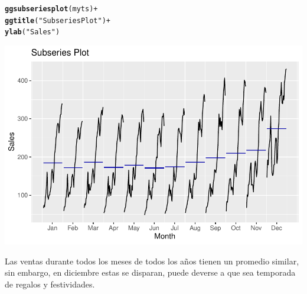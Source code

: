 \documentclass[12pt]{article}\usepackage[]{graphicx}\usepackage[]{xcolor}
\makeatletter
\def\maxwidth{ %
  \ifdim\Gin@nat@width>\linewidth
    \linewidth
  \else
    \Gin@nat@width
  \fi
}
\newcommand{\hlsng}[1]{\textcolor[rgb]{0.192,0.494,0.8}{#1}}%
\newcommand{\hlopt}[1]{\textcolor[rgb]{0,0,0}{#1}}%
\newcommand{\hldef}[1]{\textcolor[rgb]{0.345,0.345,0.345}{#1}}%
\newcommand{\hlkwd}[1]{\textcolor[rgb]{0.737,0.353,0.396}{\textbf{#1}}}%
\newenvironment{kframe}{%
 \def\at@end@of@kframe{}%
 \ifinner\ifhmode%
  \def\at@end@of@kframe{\end{minipage}}%
  \begin{minipage}{\columnwidth}%
 \fi\fi%
 \def\FrameCommand##1{\hskip\@totalleftmargin \hskip-\fboxsep
 \colorbox{shadecolor}{##1}\hskip-\fboxsep
     \hskip-\linewidth \hskip-\@totalleftmargin \hskip\columnwidth}%
 \MakeFramed {\advance\hsize-\width
   \@totalleftmargin\z@ \linewidth\hsize
   \@setminipage}}%
 {\par\unskip\endMakeFramed%
 \at@end@of@kframe}
\newenvironment{knitrout}{}{} %
\makeatother
\begin{document}
\begin{knitrout}
\color{fgcolor}\begin{kframe}
\begin{alltt}
\hlkwd{ggsubseriesplot}\hldef{(myts)} \hlopt{+}
  \hlkwd{ggtitle}\hldef{(}\hlsng{"Subseries Plot"}\hldef{)} \hlopt{+}
  \hlkwd{ylab}\hldef{(}\hlsng{"Sales"}\hldef{)}
\end{alltt}
\end{kframe}

{\centering \includegraphics[width=\maxwidth]{figure/unnamed-chunk-4-1} 

}


\end{knitrout}


Las ventas durante todos los meses de todos los años tienen un promedio similar, sin embargo, en diciembre estas se disparan, puede deverse a que sea temporada de regalos y festividades.
\end{document}
